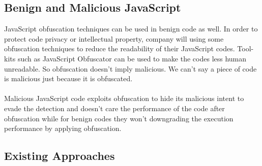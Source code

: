 \documentclass[11pt]{article}
\begin{document}
\subsection{Benign and Malicious JavaScript}
JavaScript obfuscation techniques can be used in benign code as well. In order to protect code privacy or intellectual property, company will using some obfuscation techniques to reduce the readability of their JavaScript codes. Tool-kits such as JavaScript Obfuscator \cite{JSObfuscator} can be used to make the codes less human unreadable. So obfuscation doesn't imply malicious. We can't say a piece of code is malicious just because it is obfuscated.\\ \\
Malicious JavaScript code exploits obfuscation to hide its malicious intent to evade the detection and doesn't care the performance of the code after obfuscation while for benign codes they won't downgrading the execution performance by applying obfuscation.

\subsection{Existing Approaches} 
\end{document}
